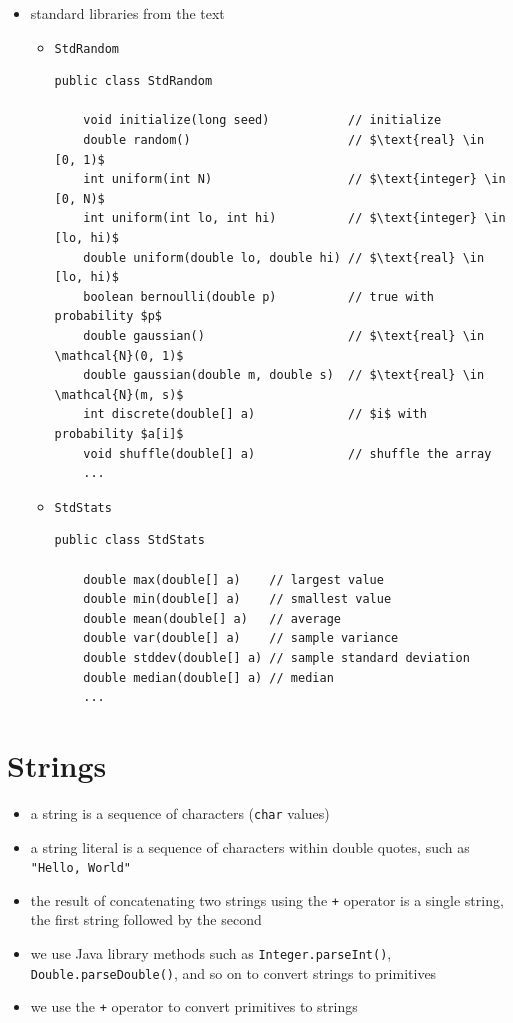 \documentclass[8pt,a4paper,compress]{beamer}
\begin{document}
\begin{frame}[fragile]
\begin{itemize}
\item standard libraries from the text
\begin{itemize}
\item \lstinline{StdRandom}
\begin{lstlisting}[language={},mathescape]
public class StdRandom

    void initialize(long seed)           // initialize
    double random()                      // $\text{real} \in [0, 1)$
    int uniform(int N)                   // $\text{integer} \in [0, N)$
    int uniform(int lo, int hi)          // $\text{integer} \in [lo, hi)$
    double uniform(double lo, double hi) // $\text{real} \in [lo, hi)$
    boolean bernoulli(double p)          // true with probability $p$
    double gaussian()                    // $\text{real} \in \mathcal{N}(0, 1)$
    double gaussian(double m, double s)  // $\text{real} \in \mathcal{N}(m, s)$
    int discrete(double[] a)             // $i$ with probability $a[i]$
    void shuffle(double[] a)             // shuffle the array
    ...
\end{lstlisting}

\item \lstinline{StdStats}
\begin{lstlisting}[language={}]
public class StdStats

    double max(double[] a)    // largest value
    double min(double[] a)    // smallest value
    double mean(double[] a)   // average
    double var(double[] a)    // sample variance
    double stddev(double[] a) // sample standard deviation
    double median(double[] a) // median
    ...
\end{lstlisting}
\end{itemize}
\end{itemize}
\end{frame}

\section{Strings}
\begin{frame}[fragile]
\begin{itemize}
\item a string is a sequence of characters (\lstinline{char} values) 

\item a string literal is a sequence of characters within double quotes, such as \lstinline{"Hello, World"}

\item the result of concatenating two strings using the \lstinline{+} operator is a single string, the first string followed by the second

\item we use Java library methods such as \lstinline{Integer.parseInt()}, \lstinline{Double.parseDouble()}, and so on to convert strings to primitives

\item we use the \lstinline{+} operator to convert primitives to strings
\end{itemize}
\end{frame}
\end{document}
